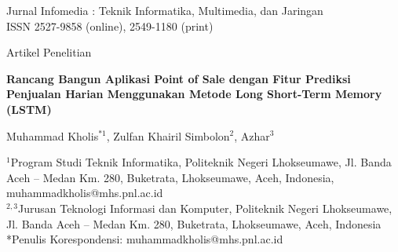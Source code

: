\documentclass[a4paper,10pt,onecolumn]{article}
\begin{document}
\noindent
\begin{minipage}{0.68\textwidth}
    \fontsize{9pt}{11pt}\selectfont
    Jurnal Infomedia : Teknik Informatika, Multimedia, dan Jaringan\\
    ISSN 2527-9858 (online), 2549-1180 (print)
\end{minipage}
\hfill
\begin{minipage}{0.3\textwidth}
    \raggedleft
    \fontsize{9pt}{11pt}\selectfont
    Artikel Penelitian
\end{minipage}

\vspace{0.8cm}

\begin{flushleft}
\fontsize{14pt}{16pt}\selectfont\bfseries
Rancang Bangun Aplikasi Point of Sale dengan Fitur Prediksi Penjualan Harian Menggunakan Metode Long Short-Term Memory (LSTM)
\end{flushleft}

\vspace{0.4cm}

\begin{flushleft}
\fontsize{11pt}{13pt}\selectfont
Muhammad Kholis$^{*1}$, Zulfan Khairil Simbolon$^{2}$, Azhar$^{3}$
\end{flushleft}

\vspace{0.15cm}

\begin{flushleft}
\fontsize{9pt}{11pt}\selectfont
$^{1}$Program Studi Teknik Informatika, Politeknik Negeri Lhokseumawe, Jl. Banda Aceh -- Medan Km. 280, Buketrata, Lhokseumawe, Aceh, Indonesia, muhammadkholis@mhs.pnl.ac.id\\
$^{2,3}$Jurusan Teknologi Informasi dan Komputer, Politeknik Negeri Lhokseumawe, Jl. Banda Aceh -- Medan Km. 280, Buketrata, Lhokseumawe, Aceh, Indonesia\\
*Penulis Korespondensi: muhammadkholis@mhs.pnl.ac.id
\end{flushleft}

\vspace{0.6cm}
\end{document}

